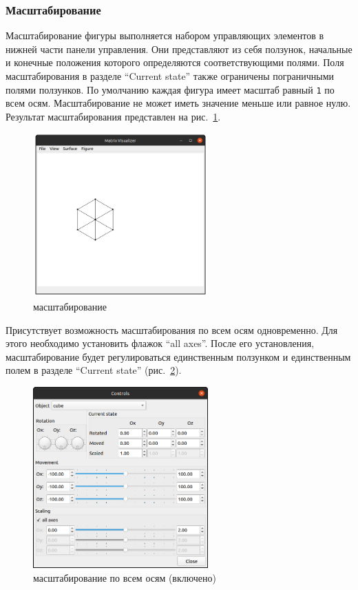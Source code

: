 \documentclass[12pt, a4paper, hidelinks]{article}
\begin{document}
\subsubsection{Масштабирование}

Масштабирование фигуры выполняется набором управляющих элементов в нижней части панели управления. Они представляют из себя ползунок, начальные и конечные положения которого определяются соответствующими полями. Поля масштабирования в разделе \enquote{Current state} также ограничены пограничными полями ползунков. По умолчанию каждая фигура имеет масштаб равный \verb|1| по всем осям. Масштабирование не может иметь значение меньше или равное нулю. Результат масштабирования представлен на рис.~\ref{scaling}.

\begin{figure}[htbp!]
	\centering
	\includegraphics[width=0.6\textwidth]{images/scaling.png}
	\caption{масштабирование}
	\label{scaling}
\end{figure}

Присутствует возможность масштабирования по всем осям одновременно. Для этого необходимо установить флажок \enquote{all axes}. После его установления, масштабирование будет регулироваться единственным ползунком и единственным полем в разделе \enquote{Current state} (рис.~\ref{contols_all}).

\begin{figure}[htbp!]
	\centering
	\includegraphics[width=0.6\textwidth]{images/controlsallaxes.png}
	\caption{масштабирование по всем осям (включено)}
	\label{contols_all}
\end{figure}
\end{document}
